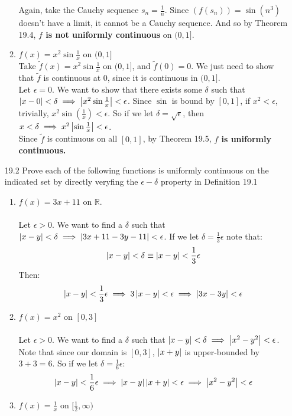 \begin{enumerate}
\begin{enumerate}
        Again, take the Cauchy sequence $s_n = \frac{1}{n}$. Since $(f(s_n)) = \sin(n^3)$ doesn't have a limit, it cannot be a Cauchy sequence. And so by Theorem 19.4, \textbf{$f$ is not uniformly continuous} on $(0,1]$.
      \item $f(x) = x^2 \sin \frac{1}{x}$ on $(0,1]$\\
        Take $\tilde{f}(x) = x^2 \sin \frac{1}{x}$ on $(0,1]$, and $\tilde{f}(0) = 0$. We just need to show that $\tilde{f}$ is continuous at $0$, since it is continuous in $(0,1]$.\\

        Let $\epsilon = 0$. We want to show that there exists some $\delta$ such that $\left\vert x-0 \right\vert < \delta \implies \left\vert x^2 \sin \frac{1}{x} \right\vert < \epsilon$. Since $\sin$ is bound by $[0,1]$, if $x^2 < \epsilon$, trivially, $x^2 \sin(\frac{1}{x}) < \epsilon$. So if we let $\delta = \sqrt{\epsilon}$, then $x < \delta \implies x^2\left\vert \sin \frac{1}{x} \right\vert < \epsilon$.\\

        Since $\tilde{f}$ is continuous on all $[0,1]$, by Theorem 19.5, \textbf{$f$ is uniformly continuous.}
    \end{enumerate}
  \item [19.2]
    Prove each of the following functions is uniformly continuous on the indicated set by directly veryfing the $\epsilon-\delta$ property in Definition 19.1
    \begin{enumerate}
      \item $f(x) = 3x+ 11$ on $\mathds{R}$.\\\\

        Let $\epsilon > 0$. We want to find a $\delta$ such that $\left\vert x-y \right\vert < \delta \implies \left\vert 3x + 11 - 3y - 11 \right\vert < \epsilon$. If we let $\delta = \frac{1}{3} \epsilon$ note that:
        $$\left\vert x-y \right\vert < \delta \equiv \left\vert x-y \right\vert < \frac{1}{3} \epsilon$$
        Then:
        $$\left\vert x-y \right\vert < \frac{1}{3} \epsilon \implies 3 \left\vert x-y \right\vert < \epsilon \implies \left\vert 3x-3y \right\vert < \epsilon$$
        
      \item $f(x) = x^2$ on $[0,3]$\\\\

        Let $\epsilon > 0$. We want to find a $\delta$ such that $\left\vert x-y \right\vert < \delta \implies \left\vert x^2 - y^2 \right\vert < \epsilon$. Note that since our domain is $[0,3]$, $\left\vert x+y \right\vert$ is upper-bounded by $3+3=6$. So if we let $\delta = \frac{1}{6} \epsilon$:
        $$\left\vert x-y \right\vert < \frac{1}{6} \epsilon \implies \left\vert x-y \right\vert \left\vert x+y \right\vert < \epsilon \implies \left\vert x^2 - y^2 \right\vert < \epsilon$$
      \item $f(x) = \frac{1}{x}$ on $[\frac{1}{2}, \infty)$\\\\


\end{enumerate}
\end{enumerate}
